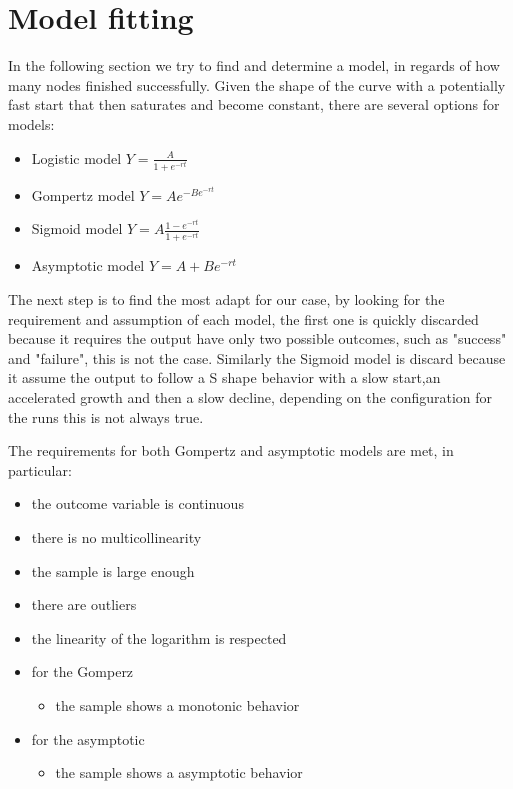 %

%
\section{Model fitting}
In the following section we try to find and determine a model, in regards of how many nodes finished successfully. Given the shape of the curve with a potentially fast start that then saturates and become constant, there are several options for models:
\begin{itemize}
	\item Logistic model $ Y = \frac{A}{1 + e^{-rt}} $
	\item Gompertz model $ Y = Ae^{-Be^{-rt}} $
	\item Sigmoid model $ Y = A\frac{1-e^{-rt}}{1+e^{-rt}}$
	\item Asymptotic model $ Y = A + Be^{-rt}$
\end{itemize} 

The next step is to find the most adapt for our case, by looking for the requirement and assumption of each model, the first one is quickly discarded because it requires the output have only two possible outcomes, such as "success" and "failure", this is not the case.
Similarly the Sigmoid model is discard because it assume the output to follow a S shape behavior with a slow start,an accelerated growth and then a slow decline, depending on the configuration for the runs this is not always true.

The requirements for both Gompertz and asymptotic models are met, in particular:
\begin{itemize}
	\item the outcome variable is continuous
	\item there is no multicollinearity
	\item the sample is large enough
	\item there are outliers
	\item the linearity of the logarithm is respected
	
	\item for the Gomperz
		\begin{itemize}
			\item the sample shows a monotonic behavior
		\end{itemize}
		\item for the asymptotic
		\begin{itemize}
			\item the sample shows a asymptotic behavior
		\end{itemize}
\end{itemize}

